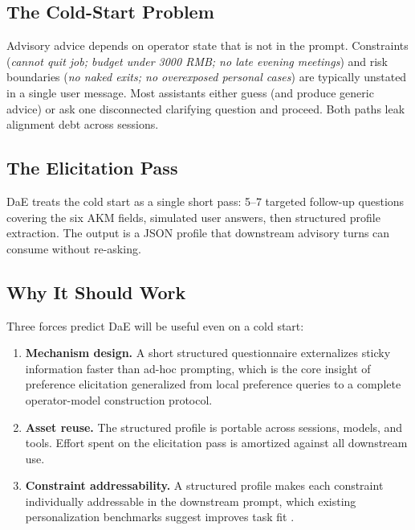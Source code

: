 \documentclass[11pt]{article}
\begin{document}
\subsection{The Cold-Start Problem}

Advisory advice depends on operator state that is not in the prompt. Constraints (\emph{cannot quit job; budget under 3000 RMB; no late evening meetings}) and risk boundaries (\emph{no naked exits; no overexposed personal cases}) are typically unstated in a single user message. Most assistants either guess (and produce generic advice) or ask one disconnected clarifying question and proceed. Both paths leak alignment debt across sessions.

\subsection{The Elicitation Pass}

DaE treats the cold start as a single short pass: 5--7 targeted follow-up questions covering the six AKM fields, simulated user answers, then structured profile extraction. The output is a JSON profile that downstream advisory turns can consume without re-asking.

\subsection{Why It Should Work}

Three forces predict DaE will be useful even on a cold start:

\begin{enumerate}[leftmargin=1.5em]
\item \textbf{Mechanism design.} A short structured questionnaire externalizes sticky information faster than ad-hoc prompting, which is the core insight of preference elicitation \citep{foschini2025preference} generalized from local preference queries to a complete operator-model construction protocol.
\item \textbf{Asset reuse.} The structured profile is portable across sessions, models, and tools. Effort spent on the elicitation pass is amortized against all downstream use.
\item \textbf{Constraint addressability.} A structured profile makes each constraint individually addressable in the downstream prompt, which existing personalization benchmarks suggest improves task fit \citep{salemi2023lamp,white2023prompt,li2016persona}.
\end{enumerate}
\end{document}

